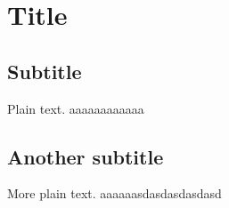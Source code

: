 \documentclass{article}
\begin{document}
\section{Title}

\subsection{Subtitle}

Plain text.
\newline
aaaaaaaaaaaa
\subsection{Another subtitle}

More plain text. 
\newline
aaaaaasdasdasdasdasd
\end{document}
